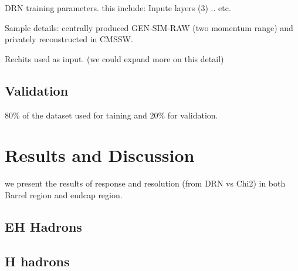 DRN training parameters. this include: Inpute layers (3) .. etc.

Sample details: centrally produced GEN-SIM-RAW (two momentum range) and privately reconstructed in CMSSW.

Rechits used as input. (we could expand more on this detail)

\subsection{Validation}

80\% of the dataset used for taining and 20\% for validation.  

\section{Results and Discussion}

we present the results of response and resolution (from DRN vs Chi2) in  both Barrel region and endcap region.  
  \subsection{EH Hadrons}
  \subsection{H hadrons} 




























